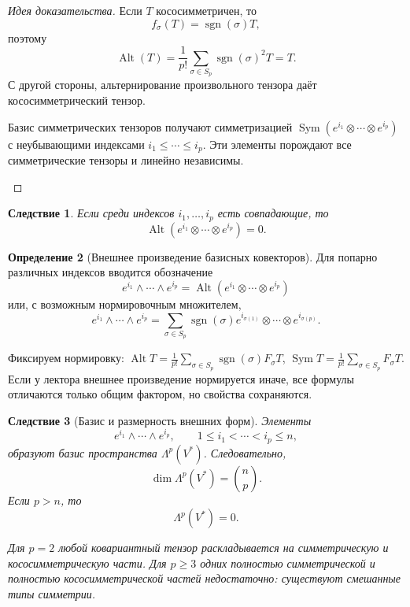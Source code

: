 \documentclass[12pt,a4paper]{article}
\theoremstyle{definition}
\newtheorem{definition}{Определение}[section]
\theoremstyle{plain}
\newtheorem{corollary}[definition]{Следствие}
\theoremstyle{remark}
\newenvironment{knowledgefix}{\begin{clarifybox}}{\end{clarifybox}}
\newcommand{\Sym}{\operatorname{Sym}}
\newcommand{\Alt}{\operatorname{Alt}}
\providecommand{\sgn}{\operatorname{sgn}}
\begin{document}
\begin{proof}[Идея доказательства]
Если $T$ кососимметричен, то
\[
    f_\sigma(T)=\sgn(\sigma)T,
\]
поэтому
\[
    \Alt(T)=\frac{1}{p!}\sum_{\sigma\in S_p}\sgn(\sigma)^2T=T.
\]
С другой стороны, альтернирование произвольного тензора даёт кососимметрический тензор.
\begin{knowledgefix}
Базис симметрических тензоров получают симметризацией \(\Sym(e^{i_1}\otimes\cdots\otimes e^{i_p})\) с неубывающими индексами \(i_1\le\cdots\le i_p\). Эти элементы порождают все симметрические тензоры и линейно независимы.
\end{knowledgefix}
\end{proof}

\begin{corollary}
Если среди индексов $i_1,\ldots,i_p$ есть совпадающие, то
\[
    \Alt(e^{i_1}\otimes\cdots\otimes e^{i_p})=0.
\]
\end{corollary}

\begin{definition}[Внешнее произведение базисных ковекторов]
Для попарно различных индексов вводится обозначение
\[
    e^{i_1}\wedge\cdots\wedge e^{i_p}
    =
    \Alt(e^{i_1}\otimes\cdots\otimes e^{i_p})
\]
или, с возможным нормировочным множителем,
\[
    e^{i_1}\wedge\cdots\wedge e^{i_p}
    =
    \sum_{\sigma\in S_p}\sgn(\sigma)
    e^{i_{\sigma(1)}}\otimes\cdots\otimes e^{i_{\sigma(p)}}.
\]
\begin{knowledgefix}
Фиксируем нормировку: \(\Alt T=\frac1{p!}\sum_{\sigma\in S_p}\sgn(\sigma)F_\sigma T\), \(\Sym T=\frac1{p!}\sum_{\sigma\in S_p}F_\sigma T\). Если у лектора внешнее произведение нормируется иначе, все формулы отличаются только общим фактором, но свойства сохраняются.
\end{knowledgefix}
\end{definition}

\begin{corollary}[Базис и размерность внешних форм]
Элементы
\[
    e^{i_1}\wedge\cdots\wedge e^{i_p},
    \qquad
    1\le i_1<\cdots<i_p\le n,
\]
образуют базис пространства $\Lambda^p(V^*)$.
Следовательно,
\[
    \dim \Lambda^p(V^*)=\binom{n}{p}.
\]
Если $p>n$, то
\[
    \Lambda^p(V^*)=0.
\]
\begin{knowledgefix}
Для \(p=2\) любой ковариантный тензор раскладывается на симметрическую и кососимметрическую части. Для \(p\ge3\) одних полностью симметрической и полностью кососимметрической частей недостаточно: существуют смешанные типы симметрии.
\end{knowledgefix}
\end{corollary}
\end{document}
